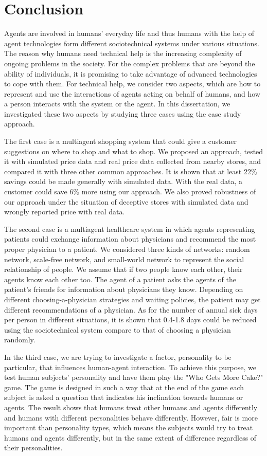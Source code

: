 \chapter{Conclusion}
\label{ch5-conclusion}

Agents are involved in humans' everyday life and thus humans with the help of agent technologies form different sociotechnical systems under various situations. The reason why humans need technical help is the increasing complexity of ongoing problems in the society. For the complex problems that are beyond the ability of individuals, it is promising to take advantage of advanced technologies to cope with them. For technical help, we consider two aspects, which are how to represent and use the interactions of agents acting on behalf of humans, and how a person interacts with the system or the agent. In this dissertation, we investigated these two aspects by studying three cases using the case study approach.

The first case is a multiagent shopping system that could give a customer suggestions on where to shop and what to shop. We proposed an approach, tested it with simulated price data and real price data collected from nearby stores, and compared it with three other common approaches. It is shown that at least 22\% savings could be made generally with simulated data. With the real data, a customer could save 6\% more using our approach. We also proved robustness of our approach under the situation of deceptive stores with simulated data and wrongly reported price with real data.  
 
The second case is a multiagent healthcare system in which agents representing patients could exchange information about physicians and recommend the most proper physician to a patient. We considered three kinds of networks: random network, scale-free network, and small-world network to represent the social relationship of people. We assume that if two people know each other, their agents know each other too. The agent of a patient asks the agents of the patient's friends for information about physicians they know. Depending on different choosing-a-physician strategies and waiting policies, the patient may get different recommendations of a physician. As for the number of annual sick days per person in different situations, it is shown that 0.4-1.8 days could be reduced using the sociotechnical system compare to that of choosing a physician randomly. 

In the third case, we are trying to investigate a factor, personality to be particular, that influences human-agent interaction. To achieve this purpose, we test human subjects' personality and have them play the "Who Gets More Cake?" game. The game is designed in such a way that at the end of the game each subject is asked a question that indicates his inclination towards humans or agents. The result shows that humans treat other humans and agents differently and humans with different personalities behave differently. However, fair is more important than personality types, which means the subjects would try to treat humans and agents differently, but in the same extent of difference regardless of their personalities.     

